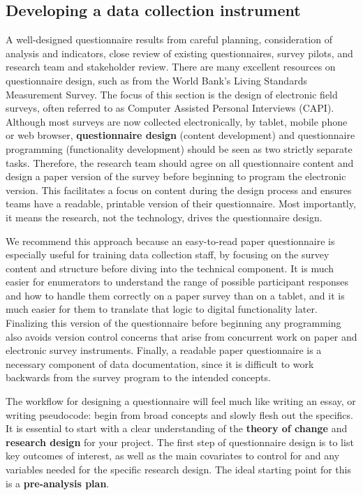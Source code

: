 \subsection{Developing a data collection instrument}

A well-designed questionnaire results from careful planning,
consideration of analysis and indicators, close review of existing questionnaires,
survey pilots, and research team and stakeholder review.
There are many excellent resources on questionnaire design,
such as from the World Bank's Living Standards Measurement Survey.\cite{glewwe2000designing}
The focus of this section is the design of electronic field surveys,
often referred to as Computer Assisted Personal Interviews (CAPI).
Although most surveys are now collected electronically, by tablet, mobile phone or web browser,
\textbf{questionnaire design}
(content development) and questionnaire programming (functionality development)
should be seen as two strictly separate tasks.
Therefore, the research team should agree on all questionnaire content
and design a paper version of the survey before beginning to program the electronic version.
This facilitates a focus on content during the design process
and ensures teams have a readable, printable version of their questionnaire.
Most importantly, it means the research, not the technology, drives the questionnaire design.

We recommend this approach because an easy-to-read paper questionnaire
is especially useful for training data collection staff,
by focusing on the survey content and structure before diving into the technical component.
It is much easier for enumerators to understand the range of possible participant responses
and how to handle them correctly on a paper survey than on a tablet,
and it is much easier for them to translate that logic to digital functionality later.
Finalizing this version of the questionnaire before beginning any programming
also avoids version control concerns that arise from concurrent work
on paper and electronic survey instruments.
Finally, a readable paper questionnaire is a necessary component of data documentation,
since it is difficult to work backwards from the survey program to the intended concepts.

The workflow for designing a questionnaire will feel much like writing an essay, or writing pseudocode:
begin from broad concepts and slowly flesh out the specifics.
It is essential to start with a clear understanding of the
\textbf{theory of change}
and \textbf{research design} for your project.
The first step of questionnaire design is to list key outcomes of interest,
as well as the main covariates to control for and any variables needed for the specific research design.
The ideal starting point for this is a \textbf{pre-analysis plan}.


